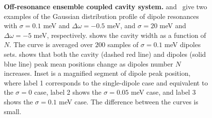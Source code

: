 \begin{figure}[htp]
\begin{tabular}{cc}
 \end{tabular}
\caption[Spectral modification of off-resonance ensemble.]{\textbf{  Off-resonance ensemble coupled cavity system.}  and~ give two examples of the Gaussian distribution profile of dipole resonances with $\sigma=0.1$ meV and $\Delta\omega=-0.5$ meV, and $\sigma=20$ meV and $\Delta\omega=-5$ meV, respectively.
 shows the cavity width as a function of $N$.
The curve is averaged over $200$ samples of $\sigma=0.1$ meV dipoles sets.
 shows that both the cavity (dashed red line) and dipoles (solid blue line) peak mean positions change as dipoles number $N$ increases. Inset is a magnified segment of dipole peak position,
where label 1 corresponds to the single-dipole case and equivalent to the $\sigma=0$ case,
label 2 shows the $\sigma=0.05$ meV case,
and label 3 shows the $\sigma=0.1$ meV case.
The difference between the curves is small.}
\end{figure}


